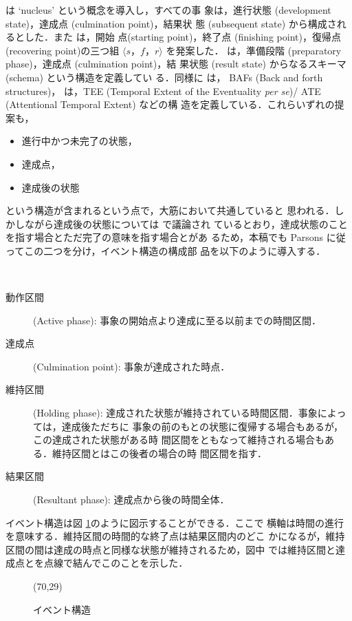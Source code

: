 \cite{Moens88} は `nucleus' という概念を導入し，すべての事
象は，進行状態 (development state)，達成点 (culmination point)，結果状
態 (subsequent state) から構成されるとした．また \cite{Gunji92} は，開始
点(starting point)，終了点 (finishing point)，復帰点 (recovering
point)の三つ組 $\langle s，f，r\rangle$ を発案した．\cite{Kamp93} は，準備段階 (preparatory phase)，達成点 (culmination point)，結
果状態 (result state) からなるスキーマ (schema) という構造を定義してい
る．同様に \cite{Blackburn96} は， BAFs (Back and forth
structures)，\cite{Terenziani93} は，TEE (Temporal Extent of the
Eventuality {\it per se})/ ATE (Attentional Temporal Extent) などの構
造を定義している．これらいずれの提案も，
\begin{itemize}
\item 進行中かつ未完了の状態，
\item 達成点，
\item 達成後の状態
\end{itemize}
という構造が含まれるという点で，大筋において共通していると
思われる．しかしながら達成後の状態については \cite{Parsons90} で議論され
ているとおり，達成状態のことを指す場合とただ完了の意味を指す場合とがあ
るため，本稿でも Parsons に従ってこの二つを分け，イベント構造の構成部
品を以下のように導入する．

\begin{my-def}[イベント構造]\label{def:struct}~
\begin{description}
\item[動作区間] (Active phase):
事象の開始点より達成に至る以前までの時間区間．
\item[達成点] (Culmination point):
事象が達成された時点．
\item[維持区間] (Holding phase):
達成された状態が維持されている時間区間．事象によっては，達成後ただちに
事象の前のもとの状態に復帰する場合もあるが，この達成された状態がある時
間区間をともなって維持される場合もある．維持区間とはこの後者の場合の時
間区間を指す．
\item[結果区間] (Resultant phase): 達成点から後の時間全体．
\end{description}
\end{my-def}
イベント構造は図 \ref{fig:struct}のように図示することができる．ここで
横軸は時間の進行を意味する．維持区間の時間的な終了点は結果区間内のどこ
かになるが，維持区間の間は達成の時点と同様な状態が維持されるため，図中
では維持区間と達成点とを点線で結んでこのことを示した．

\begin{figure}[htbp]
\atari(70,29)
\caption{イベント構造}\label{fig:struct}
\end{figure}

